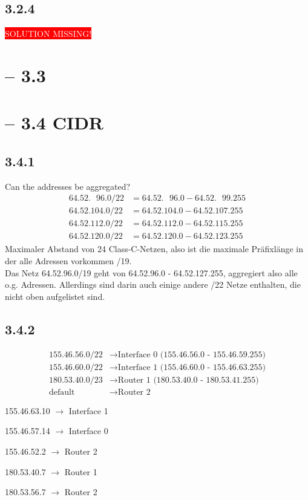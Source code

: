 \documentclass[a4paper,
			llpt,
			solution,
			accentcolor=tud2d,
			colorbacktitle
			]
			{tudexercise}
\newcommand{\8}{$\infty$}
\begin{document}
\subsection{3.2.4}
\colorbox{red}{\textcolor{white}{SOLUTION MISSING!}}
\section{ -- 3.3}
\section{ -- 3.4 CIDR}
\subsection{3.4.1}
Can the addresses be aggregated?\\
\begin{align*}
64.52.\text{~~}96.0/22 &= 64.52.\text{~~}96.0 - 64.52.\text{~~}99.255 \\
64.52.104.0/22 &= 64.52.104.0 - 64.52.107.255 \\
64.52.112.0/22 &= 64.52.112.0 - 64.52.115.255 \\ 
64.52.120.0/22 &= 64.52.120.0 - 64.52.123.255
\end{align*}
Maximaler Abstand von 24 Class-C-Netzen, also ist die maximale Präfixlänge in
der alle Adressen vorkommen /19.\\
Das Netz 64.52.96.0/19 geht von 64.52.96.0 - 64.52.127.255, aggregiert also alle o.g. Adressen. Allerdings sind darin auch einige andere /22 Netze enthalten, die nicht oben aufgelistet sind.

\subsection{3.4.2}
\begin{align*}
155.46.56.0/22 &\rightarrow \text{Interface 0 (155.46.56.0 - 155.46.59.255)}\\
155.46.60.0/22 &\rightarrow \text{Interface 1 (155.46.60.0 - 155.46.63.255)}\\
180.53.40.0/23 &\rightarrow \text{Router 1 (180.53.40.0 - 180.53.41.255)}\\
\text{default} &\rightarrow \text{Router 2}
\end{align*}
\begin{multicols}{3}
\begin{compactenum}
\item 155.46.63.10 $\rightarrow$ Interface 1
\item 155.46.57.14 $\rightarrow$ Interface 0
\item 155.46.52.2  $\rightarrow$ Router 2
\item 180.53.40.7  $\rightarrow$ Router 1
\item 180.53.56.7  $\rightarrow$ Router 2
\end{compactenum}
\end{multicols}
\end{document}
